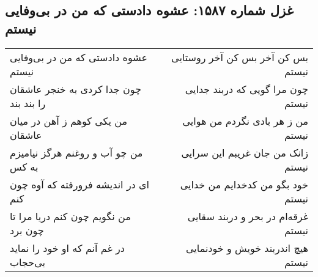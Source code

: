 \begin{center}
\section*{غزل شماره ۱۵۸۷: عشوه دادستی که من در بی‌وفایی نیستم}
\label{sec:1587}
\begin{longtable}{l p{0.5cm} r}
عشوه دادستی که من در بی‌وفایی نیستم
&&
بس کن آخر بس کن آخر روستایی نیستم
\\
چون جدا کردی به خنجر عاشقان را بند بند
&&
چون مرا گویی که دربند جدایی نیستم
\\
من یکی کوهم ز آهن در میان عاشقان
&&
من ز هر بادی نگردم من هوایی نیستم
\\
من چو آب و روغنم هرگز نیامیزم به کس
&&
زانک من جان غریبم این سرایی نیستم
\\
ای در اندیشه فرورفته که آوه چون کنم
&&
خود بگو من کدخدایم من خدایی نیستم
\\
من نگویم چون کنم دریا مرا تا چون برد
&&
غرقه‌ام در بحر و دربند سقایی نیستم
\\
در غم آنم که او خود را نماید بی‌حجاب
&&
هیچ اندربند خویش و خودنمایی نیستم
\\
\end{longtable}
\end{center}
